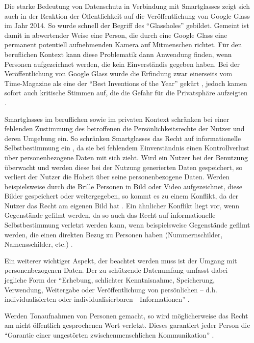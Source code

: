 Die starke Bedeutung von Datenschutz in Verbindung mit Smartglasses zeigt sich auch in der Reaktion der Öffentlichkeit auf die Veröffentlichung von Google Glass im Jahr 2014. So wurde schnell der Begriff des \enquote{Glassholes} \cite[S.~14]{ThomasDirkMetzgerHelmutNiegemannHrsg2018} gebildet. Gemeint ist damit in abwertender Weise eine Person, die durch eine Google Glass eine permanent potentiell aufnehmenden Kamera auf Mitmenschen richtet. Für den beruflichen Kontext kann diese Problematik dann Anwendung finden, wenn Personen aufgezeichnet werden, die kein Einverständis gegeben haben. Bei der Veröffentlichung von Google Glass wurde die Erfindung zwar einerseits vom Time-Magazine als eine der \enquote{Best Inventions of the Year} gekürt \cite{Bilton2015}, jedoch kamen sofort auch kritische Stimmen auf, die die Gefahr für die Privatsphäre aufzeigten \cite[S.~67]{Schwenke2016}. 

Smartglasses im beruflichen  sowie im privaten Kontext schränken bei einer fehlenden Zustimmung des betroffenen die Persönlichkeitsrechte der Nutzer und deren Umgebung ein. So schränken Smartglasses das Recht auf informationelle Selbstbestimmung ein \cite[S.~100]{Schwenke2016}, da sie bei fehlendem Einverständnis einen Kontrollverlust über personenbezogene Daten mit sich zieht. Wird ein Nutzer bei der Benutzung überwacht und werden diese bei der Nutzung generierten Daten gespeichert, so verliert der Nutzer die Hoheit über seine personenbezogene Daten. Werden beispielsweise durch die Brille Personen in Bild oder Video aufgezeichnet, diese Bilder gespeichert oder weitergegeben, so kommt es zu einem Konflikt, da der Nutzer das Recht am eigenen Bild hat \cite[S.~104ff]{Schwenke2016} \cite[S.~109f]{Schwenke2016}. 
Ein ähnlicher Konflikt liegt vor, wenn Gegenstände gefilmt werden, da so auch das Recht auf informationelle Selbstbestimmung verletzt werden kann, wenn beispielsweise Gegenstände gefilmt werden, die einen direkten Bezug zu Personen haben (Nummernschilder, Namensschilder, etc.) \cite[S.~106]{Schwenke2016}. 

Ein weiterer wichtiger Aspekt, der beachtet werden muss ist der Umgang mit personenbezogenen Daten. Der zu schützende Datenumfang umfasst dabei jegliche Form der
\enquote{Erhebung, schlichter Kenntnisnahme, Speicherung, Verwendung, Weitergabe oder Veröffentlichung von persönlichen – d.h. individualisierten oder individualisierbaren - Informationen} \cite[S.~108]{Schwenke2016}.

Werden Tonaufnahmen von Personen gemacht, so wird möglicherweise das Recht am nicht öffentlich gesprochenen Wort verletzt. Dieses garantiert jeder Person die \enquote{Garantie einer ungestörten zwischenmenschlichen Kommunikation} \cite[S.~112]{Schwenke2016}.


